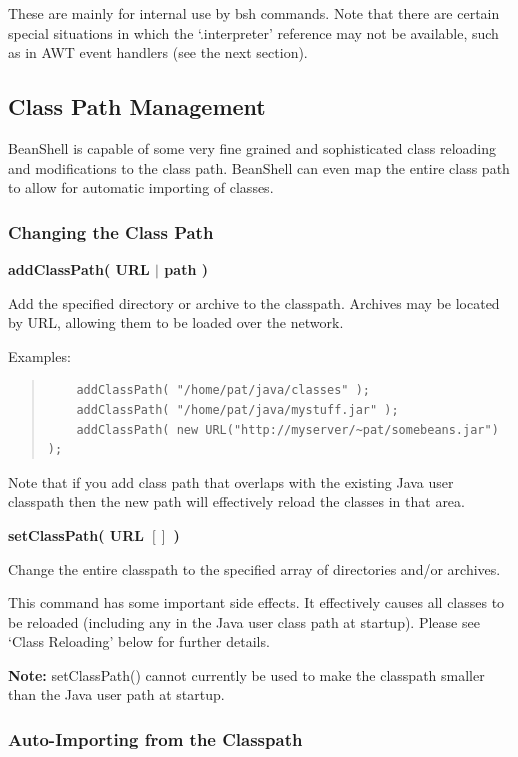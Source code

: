 \documentclass[twoside,11pt]{article}
\renewcommand{\_}{\texttt{\symbol{95}}}
\begin{document}
These are mainly for internal use by bsh commands.  Note that there
are certain special situations in which the `.interpreter' reference
may not be available, such as in AWT event handlers (see the next
section).

\subsection{Class Path Management}

BeanShell is capable of some very fine grained and sophisticated class
reloading and modifications to the class path.  BeanShell can even map
the entire class path to allow for automatic importing of classes.

\subsubsection{Changing the Class Path}

\textbf{addClassPath( URL $|$ path )}

Add the specified directory or archive to the classpath.  Archives may
be located by URL, allowing them to be loaded over the network.

Examples:
\begin{quote}
\begin{verbatim}
    addClassPath( "/home/pat/java/classes" );
    addClassPath( "/home/pat/java/mystuff.jar" );
    addClassPath( new URL("http://myserver/~pat/somebeans.jar") );
\end{verbatim}
\end{quote}

Note that if you add class path that overlaps with the existing Java
user classpath then the new path will effectively reload the classes
in that area.

\textbf{setClassPath( URL $[]$ )}

Change the entire classpath to the specified array of directories
and/or archives.

This command has some important side effects.  It effectively causes
all classes to be reloaded (including any in the Java user class path
at startup).  Please see `Class Reloading' below for further details.

\textbf{Note:} setClassPath() cannot currently be used to make the classpath
smaller than the Java user path at startup.

\subsubsection{Auto-Importing from the Classpath}
\end{document}

